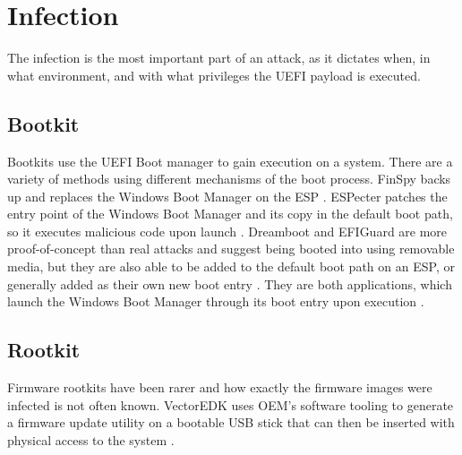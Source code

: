 \section{Infection}

The infection is the most important part of an attack, as it dictates when, in what environment, and with what privileges the \ac{UEFI} payload is executed.

\subsection{Bootkit}

Bootkits use the \ac{UEFI} Boot manager to gain execution on a system.
There are a variety of methods using different mechanisms of the boot process.
FinSpy backs up and replaces the Windows Boot Manager  on the \ac{ESP} \cite{finspy}.
ESPecter patches the entry point of the Windows Boot Manager  and its copy  in the default boot path, so it executes malicious code upon launch \cite{especter}.
Dreamboot and EFIGuard are more proof-of-concept than real attacks and suggest being booted into using removable media, but they are also able to be added to the default boot path on an \ac{ESP}, or generally added as their own new boot entry \cite{efiguard}.
They are both applications, which launch the Windows Boot Manager through its boot entry upon execution \cite{dreamboot, efiguard}.

\subsection{Rootkit}

Firmware rootkits have been rarer and how exactly the firmware images were infected is not often known.
VectorEDK uses \ac{OEM}'s software tooling to generate a firmware update utility on a bootable \ac{USB} stick that can then be inserted with physical access to the system \cite{mosaicregressor}.

